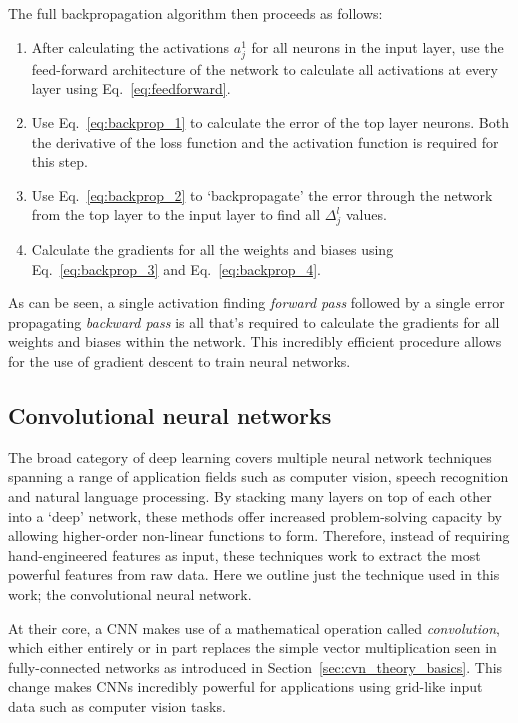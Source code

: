 The full backpropagation algorithm then proceeds as follows:
\begin{enumerate}
    \item After calculating the activations $a^{1}_{j}$ for all neurons in the input layer, use
          the feed-forward architecture of the network to calculate all activations at every layer
          using Eq.~\ref{eq:feedforward}.
    \item Use Eq.~\ref{eq:backprop_1} to calculate the error of the top layer neurons. Both the
          derivative of the loss function and the activation function is required for this step.
    \item Use Eq.~\ref{eq:backprop_2} to `backpropagate' the error through the network from the
          top layer to the input layer to find all $\Delta^{l}_{j}$ values.
    \item Calculate the gradients for all the weights and biases using Eq.~\ref{eq:backprop_3} and
          Eq.~\ref{eq:backprop_4}.
\end{enumerate}
As can be seen, a single activation finding \emph{forward pass} followed by a single error
propagating \emph{backward pass}  is all that's required to calculate the gradients for all
weights and biases within the network. This incredibly efficient procedure allows for the use of
gradient descent to train neural networks.

\subsection{Convolutional neural networks} %
\label{sec:cvn_theory_conv} %

The broad category of deep learning covers multiple neural network techniques spanning a range of
application fields such as computer vision, speech recognition and natural language processing. By
stacking many layers on top of each other into a `deep' network, these methods offer increased
problem-solving capacity by allowing higher-order non-linear functions to form. Therefore, instead
of requiring hand-engineered features as input, these techniques work to extract the most powerful
features from raw data. Here we outline just the technique used in this work; the convolutional
neural network.

At their core, a CNN makes use of a mathematical operation called \emph{convolution}, which either
entirely or in part replaces the simple vector multiplication seen in fully-connected networks as
introduced in Section~\ref{sec:cvn_theory_basics}. This change makes CNNs incredibly powerful for
applications using grid-like input data such as computer vision tasks.


